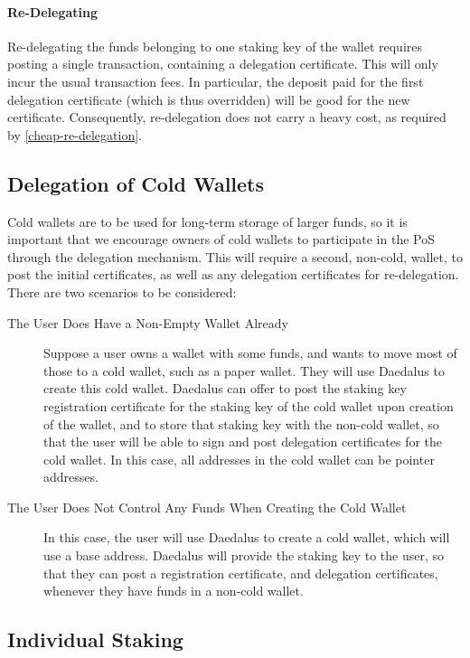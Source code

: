 \documentclass[11pt,a4paper,dvipsnames,twosided]{article}
\begin{document}
\paragraph{Re-Delegating}
Re-delegating the funds belonging to one staking key of the wallet
requires posting a single transaction, containing a delegation
certificate. This will only incur the usual transaction fees. In
particular, the deposit paid for the first delegation certificate
(which is thus overridden) will be good for the new
certificate. Consequently, re-delegation does not carry a heavy cost,
as required by \cref{cheap-re-delegation}.

\subsection{Delegation of Cold Wallets}
\label{delegation-of-cold-wallets}

Cold wallets are to be used for long-term storage of larger funds, so
it is important that we encourage owners of cold wallets to
participate in the PoS through the delegation mechanism. This will
require a second, non-cold, wallet, to post the initial certificates,
as well as any delegation certificates for re-delegation. There are
two scenarios to be considered:

\begin{description}
\item[The User Does Have a Non-Empty Wallet Already] Suppose a user
  owns a wallet with some funds, and wants to move most of those to a
  cold wallet, such as a paper wallet. They will use Daedalus to
  create this cold wallet. Daedalus can offer to post the staking key
  registration certificate for the staking key of the cold wallet upon
  creation of the wallet, and to store that staking key with the
  non-cold wallet, so that the user will be able to sign and post
  delegation certificates for the cold wallet. In this case, all
  addresses in the cold wallet can be pointer addresses.
\item[The User Does Not Control Any Funds When Creating the Cold
  Wallet] In this case, the user will use Daedalus to create a cold
  wallet, which will use a base address. Daedalus will provide the
  staking key to the user, so that they can post a registration
  certificate, and delegation certificates, whenever they have funds
  in a non-cold wallet.
\end{description}

\subsection{Individual Staking}
\label{individual-staking}
\end{document}
